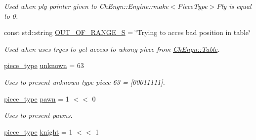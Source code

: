 \begin{DoxyCompactItemize}
\begin{DoxyCompactList}\small\item\em Used when ply pointer given to ChEngn::Engine::make$<$PieceType$>$Ply is equal to 0. \item\end{DoxyCompactList}\item 
\hypertarget{namespaceChEngn_a0c588cbbd7367bc19a844ea5966686f5}{
const std::string \hyperlink{namespaceChEngn_a0c588cbbd7367bc19a844ea5966686f5}{OUT\_\-OF\_\-RANGE\_\-S} = \char`\"{}Trying to acces bad position in table\char`\"{}}
\label{namespaceChEngn_a0c588cbbd7367bc19a844ea5966686f5}

\begin{DoxyCompactList}\small\item\em Used when uses tryes to get access to whong piece from \hyperlink{classChEngn_1_1Table}{ChEngn::Table}. \item\end{DoxyCompactList}\item 
\hypertarget{namespaceChEngn_a538ef441c024a7e5d4c1dedb5e03fc21}{
\hyperlink{namespaceChEngn_a2a35c185f259757a78e937575b8ed483}{piece\_\-type} \hyperlink{namespaceChEngn_a538ef441c024a7e5d4c1dedb5e03fc21}{unknown} = 63}
\label{namespaceChEngn_a538ef441c024a7e5d4c1dedb5e03fc21}

\begin{DoxyCompactList}\small\item\em Uses to present unknown type piece 63 = \mbox{[}00011111\mbox{]}. \item\end{DoxyCompactList}\item 
\hypertarget{namespaceChEngn_af4781da8088272ec86e35be681dde106}{
\hyperlink{namespaceChEngn_a2a35c185f259757a78e937575b8ed483}{piece\_\-type} \hyperlink{namespaceChEngn_af4781da8088272ec86e35be681dde106}{pawn} = 1 $<$$<$ 0}
\label{namespaceChEngn_af4781da8088272ec86e35be681dde106}

\begin{DoxyCompactList}\small\item\em Uses to present pawns. \item\end{DoxyCompactList}\item 
\hypertarget{namespaceChEngn_ab167075161c66436eef6d7f02507c115}{
\hyperlink{namespaceChEngn_a2a35c185f259757a78e937575b8ed483}{piece\_\-type} \hyperlink{namespaceChEngn_ab167075161c66436eef6d7f02507c115}{knight} = 1 $<$$<$ 1}
\label{namespaceChEngn_ab167075161c66436eef6d7f02507c115}


\end{DoxyCompactItemize}
